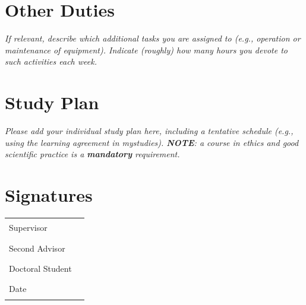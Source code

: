 \documentclass[11pt]{article}
\newcommand{\suggestion}[1]{{\itshape #1}}
\begin{document}
\section{Other Duties}
\suggestion{
If relevant, describe which additional tasks you are assigned to (e.g., operation or maintenance of equipment).
Indicate (roughly) how many hours you devote to such activities each week.
}

\section{Study Plan}
\suggestion{
Please add your individual study plan here, including a tentative schedule (e.g., using the learning agreement in mystudies).
\textbf{NOTE}: a course in ethics and good scientific practice is a \textbf{mandatory} requirement.}


\section*{Signatures}

\begin{tabular}{l l}
    Supervisor & \rule{12cm}{0.15mm}\\[10pt]
    Second Advisor & \rule{12cm}{0.15mm}\\[10pt]
    Doctoral Student & \rule{12cm}{0.15mm}\\[10pt]
    Date & \rule{12cm}{0.15mm}\\
\end{tabular}
\end{document}
